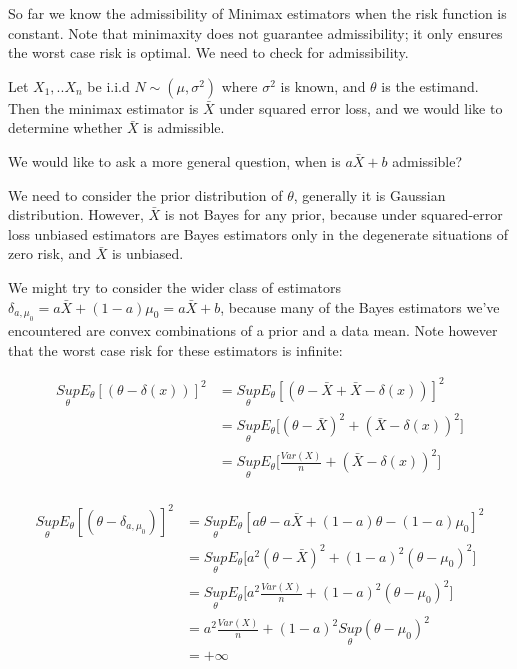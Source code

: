 So far we know the admissibility of Minimax estimators when the risk function is constant. Note that minimaxity does not guarantee admissibility; it only ensures the worst case
risk is optimal. We need to check for admissibility. 

\begin{Example}
Let $X_1,.. X_n$ be i.i.d $N \sim (\mu, \sigma^2)$ where $\sigma^2$ is known, and $\theta$ is the estimand. Then the minimax estimator is $\bar{X} $ under squared error loss, and we would like to determine
whether $\bar{X} $ is admissible.

We would like to ask a more general question, when is $a\bar{X} + b$ admissible?

We need to consider the prior distribution of $\theta$, generally it is Gaussian distribution. However, $\bar{X}$ is not Bayes for any prior, because under squared-error loss unbiased estimators are Bayes estimators only in the degenerate situations of zero risk, and $\bar{X}$ is unbiased.

We might try to consider the wider class of estimators $\delta_{a, \mu_0} = a \bar{X} + (1-a) \mu_0 = a\bar{X} + b$, because many of the Bayes estimators we've encountered are convex combinations of a prior and a data mean. Note however that the worst case risk for these estimators is infinite:

\begin{align*}
\underset{\theta}{Sup} E_{\theta} [(\theta - \delta(x))]^2 & =  \underset{\theta}{Sup} E_{\theta} [(\theta -\bar{X}  + \bar{X} - \delta(x))]^2 \\
& =  \underset{\theta}{Sup} E_{\theta} \Big [(\theta -\bar{X} )^2 + (\bar{X} - \delta(x))^2 \Big ]\\
& =  \underset{\theta}{Sup} E_{\theta} \Big [\frac{Var(X)}{n} + (\bar{X} - \delta(x))^2 \Big ]\\
\end{align*}


\begin{align*}
\underset{\theta}{Sup} E_{\theta} [(\theta -  \delta_{a, \mu_0})]^2 & =  \underset{\theta}{Sup} E_{\theta} [a\theta - a \bar{X} + (1-a) \theta - (1-a) \mu_0]^2 \\
& =  \underset{\theta}{Sup} E_{\theta} \Big [a^2 (\theta -\bar{X} )^2 + (1-a)^2 (\theta - \mu_0)^2 \Big ]\\
& =  \underset{\theta}{Sup} E_{\theta} \Big [a^2 \frac{Var(X)}{n} + (1-a)^2 (\theta - \mu_0)^2 \Big ]\\
&= a^2 \frac{Var(X)}{n} + (1-a)^2 \underset{\theta}{Sup} (\theta - \mu_0)^2 \\
&= + \infty
\end{align*}


\end{Example}
